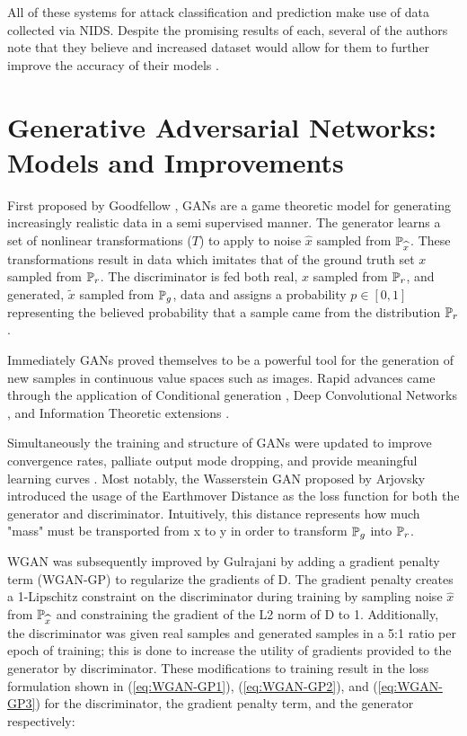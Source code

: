 All of these systems for attack classification and prediction make use of data collected via NIDS. Despite the promising results of each, several of the authors note that they believe and increased dataset would allow for them to further improve the accuracy of their models \cite{us, Faber2018, Shen2018}. 

\section{Generative Adversarial Networks: Models and Improvements}

First proposed by Goodfellow \etal \cite{Goodfellow2014}, GANs are a game theoretic model for generating increasingly realistic data in a semi supervised manner. The generator learns a set of nonlinear transformations ($T$) to apply to noise $\widehat{x}$ sampled from $\P_{\widehat{x}}$. These transformations result in data which imitates that of the ground truth set $x$ sampled from $\P_r$. The discriminator is fed both real,  $x$ sampled from $\P_r$, and generated, $\widetilde{x}$ sampled from $\P_g$, data and assigns a probability $p \in [0,1]$ representing the believed probability that a sample came from the distribution $\P_r$. 

Immediately GANs proved themselves to be a powerful tool for the generation of new samples in continuous value spaces such as images. Rapid advances came through the application of Conditional generation \cite{Mirza2014}, Deep Convolutional Networks \cite{Radford2015}, and Information Theoretic extensions \cite{Chen2016}. 

Simultaneously the training and structure of GANs were updated to improve convergence rates, palliate output mode dropping, and provide meaningful learning curves \cite{Salimans, Arjovsky2017, Gulrajani2017}. Most notably, the Wasserstein GAN proposed by Arjovsky \etal \cite{Arjovsky2017} introduced the usage of the Earthmover Distance as the loss function for both the generator and discriminator. Intuitively, this distance represents how much "mass" must be transported from x to y in order to transform $\P_g$ into $\P_r$. 

WGAN was subsequently improved by Gulrajani \etal \cite{Gulrajani2017} by adding a gradient penalty term (WGAN-GP) to regularize the gradients of D. The gradient penalty creates a 1-Lipschitz constraint on the discriminator during training by sampling noise $\widehat{x}$ from $\P_{\widehat{x}}$ and constraining the gradient of the L2 norm of D to 1. Additionally, the discriminator was given real samples and generated samples in a 5:1 ratio per epoch of training; this is done to increase the utility of gradients provided to the generator by discriminator. These modifications to training result in the loss formulation shown in (\ref{eq:WGAN-GP1}), (\ref{eq:WGAN-GP2}), and (\ref{eq:WGAN-GP3}) for the discriminator, the gradient penalty term, and the generator respectively:

